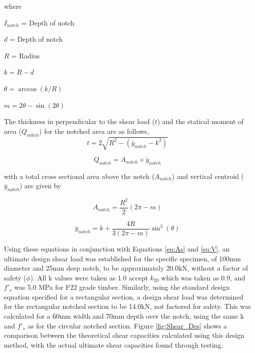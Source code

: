 \documentclass[11pt,a4paper]{article}
\numberwithin{equation}{subsection}
\begin{document}
	where\par
	$ I_{notch} $ = Depth of notch \par
	$ d $ = Depth of notch \par
	$ R $ = Radius \par
	$ k  = R - d$ \par
	$ \theta = \arccos(k/R)$ \par
	$ m = 2\theta-\sin(2\theta)$ \par

	\vspace*{\baselineskip}
	\noindent
	The thickness in perpendicular to the shear load ($t$) and the statical moment of area ($Q_{notch}$) for the notched area are as follows, 
	\begin{equation}
	t = 2\sqrt{R^{2}-( \bar y_{notch}-k^{2})}
	\end{equation}
	
	\begin{equation}
	Q_{notch} = A_{notch} \times \bar y_{notch}
	\end{equation}
	
	\noindent
	with a total cross sectional area above the notch ($A_{notch}$) and vertical centroid ($\bar{y}_{notch}$) are given by
	
	\begin{equation}
	A_{notch} = \frac{R^{2}}{2}(2\pi-m)
	\end{equation}
	
	\begin{equation}
	\bar y_{notch} = k + \frac{4R}{3(2\pi-m)}\sin^{3}(\theta)
	\end{equation}

\noindent
Using these equations in conjunction with Equations \ref{eq:As} and \ref{eq:V}, an ultimate design shear load was established for the specific specimen, of 100mm diameter and 25mm deep notch, to be approximately 20.0kN, without a factor of safety ($\phi$). All k values were taken as 1.0 accept $k_{20}$ which was taken as 0.9, and $f'_{s}$ was 5.0 MPa for F22 grade timber. Similarly, using the standard design equation specified for a rectangular section, a design shear load was determined for the rectangular notched section to be 14.0kN, not factored for safety. This was calculated for a 60mm width and 70mm depth over the notch, using the same k and $f'_{s}$ as for the circular notched section. Figure \ref{fig:Shear_Des} shows a comparison between the theoretical shear capacities calculated using this design method, with the actual ultimate shear capacities found through testing.
\end{document}
